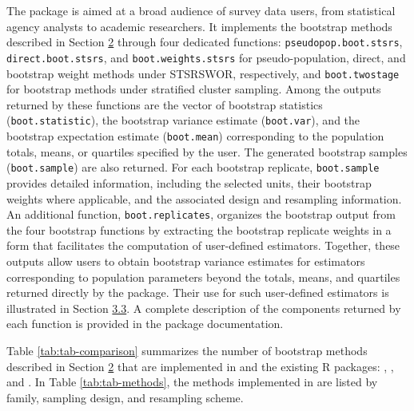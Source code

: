 The  package \citep{Mashreghi:2026} is aimed at a broad audience of survey data users, from statistical agency analysts to academic researchers. It implements the bootstrap methods described in Section \hyperref[BootSurvData]{2} through four dedicated functions: \texttt{pseudopop.boot.stsrs}, \texttt{direct.boot.stsrs}, and \texttt{boot.weights.stsrs} for pseudo-population, direct, and bootstrap weight methods under STSRSWOR, respectively, and \texttt{boot.twostage} for bootstrap methods under stratified cluster sampling. Among the outputs returned by these functions are the vector of bootstrap statistics (\texttt{boot.statistic}), the bootstrap variance estimate (\texttt{boot.var}), and the bootstrap expectation estimate (\texttt{boot.mean}) corresponding to the population totals, means, or quartiles specified by the user. The generated bootstrap samples (\texttt{boot.sample}) are also returned. For each bootstrap replicate, \texttt{boot.sample} provides detailed information, including the selected units, their bootstrap weights where applicable, and the associated design and resampling information. An additional function, \texttt{boot.replicates}, organizes the bootstrap output from the four bootstrap functions by extracting the bootstrap replicate weights in a form that facilitates the computation of user-defined estimators. Together, these outputs allow users to obtain bootstrap variance estimates for estimators corresponding to population parameters beyond the totals, means, and quartiles returned directly by the package. Their use for such user-defined estimators is illustrated in Section \hyperref[sec:userdefined]{3.3}. A complete description of the components returned by each function is provided in the package documentation.

Table \ref{tab:tab-comparison} summarizes the number of bootstrap methods described in Section \hyperref[BootSurvData]{2} that are implemented in  and the existing R packages: , , and . In Table \ref{tab:tab-methods}, the methods implemented in  are listed by family, sampling design, and resampling scheme.

